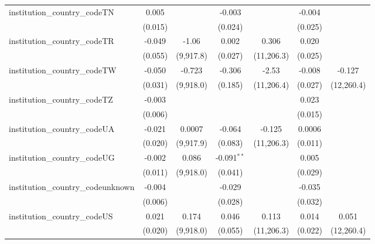 \begin{tabular}{lcccccc}
   institution\_country\_codeTN          & 0.005          &               & -0.003        &              & -0.004       &   \\   
                                         & (0.015)        &               & (0.024)       &              & (0.025)      &   \\   
   institution\_country\_codeTR          & -0.049         & -1.06         & 0.002         & 0.306        & 0.020        &   \\   
                                         & (0.055)        & (9,917.8)     & (0.027)       & (11,206.3)   & (0.025)      &   \\   
   institution\_country\_codeTW          & -0.050         & -0.723        & -0.306        & -2.53        & -0.008       & -0.127\\   
                                         & (0.031)        & (9,918.0)     & (0.185)       & (11,206.4)   & (0.027)      & (12,260.4)\\   
   institution\_country\_codeTZ          & -0.003         &               &               &              & 0.023        &   \\   
                                         & (0.006)        &               &               &              & (0.015)      &   \\   
   institution\_country\_codeUA          & -0.021         & 0.0007        & -0.064        & -0.125       & 0.0006       &   \\   
                                         & (0.020)        & (9,917.9)     & (0.083)       & (11,206.3)   & (0.011)      &   \\   
   institution\_country\_codeUG          & -0.002         & 0.086         & -0.091$^{**}$ &              & 0.005        &   \\   
                                         & (0.011)        & (9,918.0)     & (0.041)       &              & (0.029)      &   \\   
   institution\_country\_codeunknown     & -0.004         &               & -0.029        &              & -0.035       &   \\   
                                         & (0.006)        &               & (0.028)       &              & (0.032)      &   \\   
   institution\_country\_codeUS          & 0.021          & 0.174         & 0.046         & 0.113        & 0.014        & 0.051\\   
                                         & (0.020)        & (9,918.0)     & (0.055)       & (11,206.3)   & (0.022)      & (12,260.4)\\   

\end{tabular}
